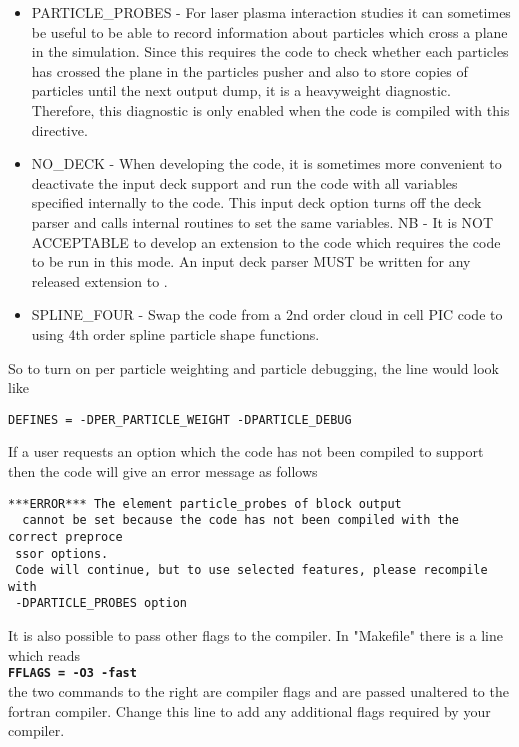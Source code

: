 \documentclass[12pt,a4paper]{article}
\newcommand{\simpleboxverbatim}{\begin{Verbatim}[obeytabs=true,frame=single,
  framerule=0.5mm,rulecolor=\color{warwickmid},formatcom=\color{black}]}
\newcommand{\inlinecode}[1]{{\color{warwickred} \bf\texttt{#1}}}
\newcommand{\EPOCH}{{\color{warwickdark}\fontfamily{phv}\selectfont{EPOCH}}}
\begin{document}
\begin{itemize}
  tracer particles. Tracer particles are specified like normal particles, and
  move about as would a normal particle with the same charge and mass, but
  tracer particles do not generate any current and are therefore passive
  elements in the simulation. Any attempt to add particle collision effects
  should remember that tracer species should not interact through collisions.
\item PARTICLE\_PROBES - For laser plasma interaction studies it can sometimes
  be useful to be able to record information about particles which cross a
  plane in the simulation. Since this requires the code to check whether each
  particles has crossed the plane in the particles pusher and also to store
  copies of particles until the next output dump, it is a heavyweight
  diagnostic. Therefore, this diagnostic is only enabled when the code is
  compiled with this directive.
\item NO\_DECK - When developing the code, it is sometimes more convenient to
  deactivate the input deck support and run the code with all variables
  specified internally to the code. This input deck option turns off the deck
  parser and calls internal routines to set the same variables. NB - It is NOT
  ACCEPTABLE to develop an extension to the code which requires the code to be
  run in this mode. An input deck parser MUST be written for any released
  extension to \EPOCH.
\item SPLINE\_FOUR - Swap the code from a 2nd order cloud in cell PIC code to
  using 4th order spline particle shape functions.
\end{itemize}

So to turn on per particle weighting and particle debugging, the line would
look like\\
\simpleboxverbatim
DEFINES = -DPER_PARTICLE_WEIGHT -DPARTICLE_DEBUG
\end{Verbatim}

If a user requests an option which the code has not been compiled to support
then the code will give an error message as follows
\simpleboxverbatim
 ***ERROR*** The element particle_probes of block output
  cannot be set because the code has not been compiled with the correct preproce
 ssor options.
 Code will continue, but to use selected features, please recompile with
 -DPARTICLE_PROBES option
\end{Verbatim}

It is also possible to pass other flags to the compiler. In "Makefile" there is
a line which reads\\
\inlinecode{FFLAGS = -O3 -fast}\\
the two commands to the right are compiler flags and are passed unaltered to
the fortran compiler. Change this line to add any additional flags required by
your compiler.
\end{document}
